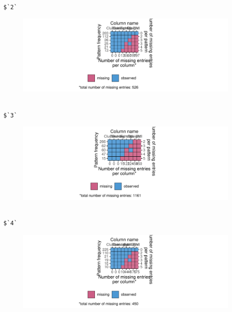 \documentclass[
  article]{jss}
\begin{document}
\begin{verbatim}

$`2`
\end{verbatim}

\begin{figure}[h]

{\centering \includegraphics{manuscript_files/figure-pdf/unnamed-chunk-49-2.pdf}

}

\end{figure}

\begin{verbatim}

$`3`
\end{verbatim}

\begin{figure}[h]

{\centering \includegraphics{manuscript_files/figure-pdf/unnamed-chunk-49-3.pdf}

}

\end{figure}

\begin{verbatim}

$`4`
\end{verbatim}

\begin{figure}[h]

{\centering \includegraphics{manuscript_files/figure-pdf/unnamed-chunk-49-4.pdf}

}

\end{figure}
\end{document}

